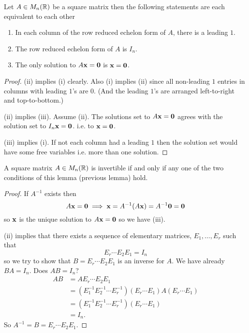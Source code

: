 \documentclass[10pt, a4paper]{article}
\begin{document}
\begin{lemma}
    Let $A \in M_n(\mathbb{R})$ be a square matrix then the following statements are each equivalent to each other
    \begin{enumerate}[label = (\roman*)]
        \item In each column of the row reduced echelon form of $A$,
        there is a leading $1$.
        \item The row reduced echelon form of $A$ is $I_n$.
        \item The only solution to $A\mathbf{x} = \mathbf{0}$ is $\mathbf{x} = \mathbf{0}$.
    \end{enumerate}
    \begin{proof}
        (ii) implies (i) clearly.
        Also (i) implies (ii) since all non-leading $1$ entries in columns with leading $1$'s are $0$.
        (And the leading $1$'s are arranged left-to-right and top-to-bottom.)

        (ii) implies (iii). Assume (ii).
        The solutions set to $A\mathbf{x} = \mathbf{0}$ agrees with the solution set to
        $I_n\mathbf{x} = \mathbf{0}$. i.e. to $\mathbf{x} = \mathbf{0}$.

        (iii) implies (i).
        If not each column had a leading $1$ then the solution set would have some free variables i.e. more than one solution.
    \end{proof}
\end{lemma}

\begin{theorem}
    A square matrix $A \in M_n(\mathbb{R})$ is invertible if and only if any one of the two conditions of this lemma (previous lemma) hold.
    \begin{proof}
        If $A ^ {-1}$ exists then
        \[
        A\mathbf{x} = \mathbf{0} \implies \mathbf{x} = A ^ {-1}(A\mathbf{x}) = A ^ {-1}\mathbf{0} = \mathbf{0}
        \]
        so $\mathbf{x}$ is the unique solution to $A\mathbf{x} = \mathbf{0}$ so we have (iii).

        (ii) implies that there exists a sequence of elementary matrices,
        $E_1, \dotsc, E_r$ such that
        \[
        E_r \dotsi E_2E_1 = I_n
        \]
        so we try to show that $B = E_r \dotsi E_2 E_1$ is an inverse for $A$.
        We have already $BA = I_n$.
        Does $AB = I_n$?
        \begin{align*}
            AB &= AE_r\dotsi E_2 E_1 \\
            &= (E_1^{-1}E_2^{-1}\dotsi E_r^{-1})(E_r \dotsi E_1)A(E_r \dotsi E_1) \\
            &= (E_1^{-1}E_2^{-1}\dotsi E_r^{-1})(E_r \dotsi E_1) \\
            &= I_n.
        \end{align*}
        So $A ^ {-1} = B = E_r \dotsi E_2E_1$.
    \end{proof}
\end{theorem}
\end{document}
